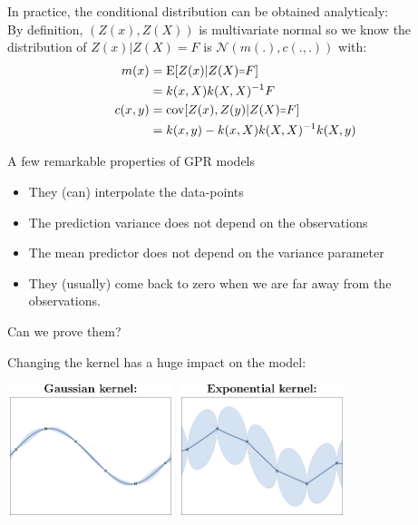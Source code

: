 \begin{frame}{}
In practice, the conditional distribution can be obtained analyticaly:\\
\vspace{5mm}
By definition, $(Z(x),Z(X))$ is multivariate normal so we know the distribution of $Z(x)|Z(X)=F$ is $\mathcal{N}(m(.),c(.,.))$ with:
\begin{equation*}
\begin{split}
    m(x) &= \E[Z(x)|Z(X) \shorteq F] \\
    &= k(x,X) k(X,X)^{-1} F \\ \vspace{3mm}
    c(x,y) &= \Cov[Z(x),Z(y)|Z(X) \shorteq F] \\
    &= k(x,y) - k(x,X) k(X,X)^{-1} k(X,y)
\end{split}
\end{equation*}
\end{frame}

\begin{frame}{}
A few remarkable properties of GPR models
\begin{itemize}
	\item They (can) interpolate the data-points
	\item The prediction variance does not depend on the observations
	\item The mean predictor does not depend on the variance parameter
	\item They (usually) come back to zero when we are far away from the observations.
\end{itemize}
Can we prove them?
\end{frame}


\begin{frame}{}
Changing the kernel \alert{has a huge impact on the model}:\\
\vspace{5mm}
\begin{center}
\includegraphics[height=3.9cm]{1_stat_models/figures/Fig2-GP-rbf} \qquad
\includegraphics[height=3.9cm]{1_stat_models/figures/Fig2-GP-exp}
\end{center}
\end{frame}

